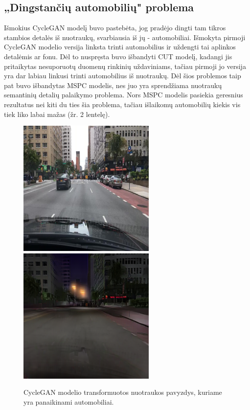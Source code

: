 \documentclass{VUMIFPSkursinis}
\begin{document}
        \subsection{„Dingstančių automobilių" problema}
            Išmokius CycleGAN modelį buvo pastebėta, jog pradėjo dingti tam tikros stambios detalės iš nuotraukų, svarbiausia iš jų - automobiliai. Išmokyta pirmoji CycleGAN modelio versija linksta trinti automobilius ir uždengti tai aplinkos detalėmis ar fonu. Dėl to nuspręsta buvo išbandyti CUT modelį, kadangi jis pritaikytas nesuporuotų duomenų rinkinių uždaviniams, tačiau pirmoji jo versija yra dar labiau linkusi trinti automobilius iš nuotraukų. Dėl šios problemos taip pat buvo išbandytas MSPC modelis, nes juo yra sprendžiama nuotraukų semantinių detalių palaikymo problema. Nors MSPC modelis pasiekia geresnius rezultatus nei kiti du ties šia problema, tačiau išlaikomų automobilių kiekis vis tiek liko labai mažas (žr. 2 lentelę).
            \begin{figure}[H]
                \centering
                \includegraphics[scale=0.8]{img/CycleGANV1/1_real_B}
                \includegraphics[scale=0.8]{img/CycleGANV1/1_fake_A}
                \captionsetup{width=.8\linewidth}
                \caption{CycleGAN modelio transformuotos nuotraukos pavyzdys, kuriame yra panaikinami automobiliai.}
                \label{img:mlp}
            \end{figure}
\end{document}
